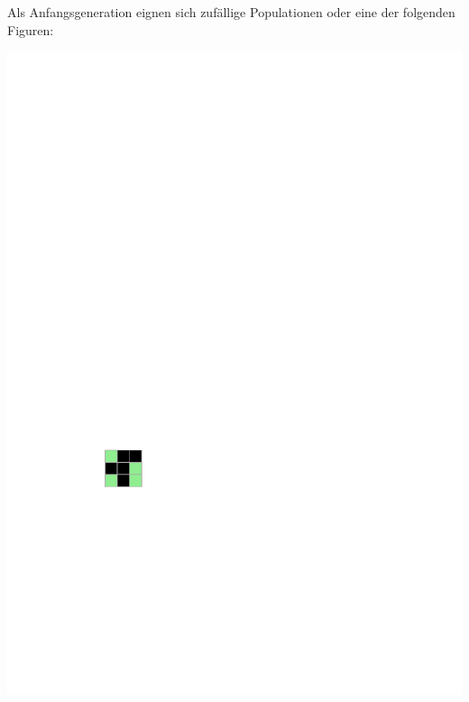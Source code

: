 Als Anfangsgeneration eignen sich zufällige Populationen oder eine der folgenden Figuren:
\begin{center}
	\includegraphics[scale=1]{figures/gol_init1}
	\hspace{5mm}

\end{center}
